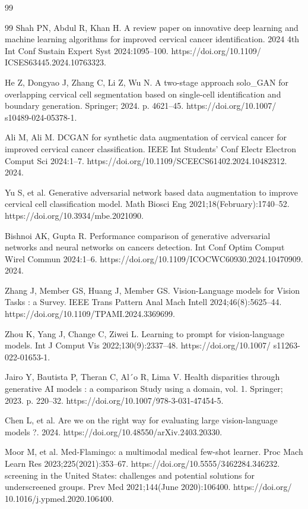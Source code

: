 \documentclass{svjour3}
\begin{document}
\begin{thebibliography}{99}
\begin{thebibliography}{99}
 Shah PN, Abdul R, Khan H. A review paper on innovative deep learning and machine learning algorithms for improved cervical cancer identification. 2024 4th Int Conf Sustain Expert Syst 2024:1095–100. https://doi.org/10.1109/ ICSES63445.2024.10763323.

 He Z, Dongyao J, Zhang C, Li Z, Wu N. A two-stage approach solo_GAN for overlapping cervical cell segmentation based on single-cell identification and boundary generation. Springer; 2024. p. 4621–45. https://doi.org/10.1007/ s10489-024-05378-1.

 Ali M, Ali M. DCGAN for synthetic data augmentation of cervical cancer for improved cervical cancer classification. IEEE Int Students’ Conf Electr Electron Comput Sci 2024:1–7. https://doi.org/10.1109/SCEECS61402.2024.10482312. 2024.

 Yu S, et al. Generative adversarial network based data augmentation to improve cervical cell classification model. Math Biosci Eng 2021;18(February):1740–52. https://doi.org/10.3934/mbe.2021090.

 Bishnoi AK, Gupta R. Performance comparison of generative adversarial networks and neural networks on cancers detection. Int Conf Optim Comput Wirel Commun 2024:1–6. https://doi.org/10.1109/ICOCWC60930.2024.10470909. 2024.

 Zhang J, Member GS, Huang J, Member GS. Vision-Language models for Vision Tasks : a Survey. IEEE Trans Pattern Anal Mach Intell 2024;46(8):5625–44. https://doi.org/10.1109/TPAMI.2024.3369699.

 Zhou K, Yang J, Change C, Ziwei L. Learning to prompt for vision-language models. Int J Comput Vis 2022;130(9):2337–48. https://doi.org/10.1007/ s11263-022-01653-1.

 Jairo Y, Bautista P, Theran C, Al´o R, Lima V. Health disparities through generative AI models : a comparison Study using a domain, vol. 1. Springer; 2023. p. 220–32. https://doi.org/10.1007/978-3-031-47454-5.

 Chen L, et al. Are we on the right way for evaluating large vision-language models ?. 2024. https://doi.org/10.48550/arXiv.2403.20330.

 Moor M, et al. Med-Flamingo: a multimodal medical few-shot learner. Proc Mach Learn Res 2023;225(2021):353–67. https://doi.org/10.5555/3462284.346232. screening in the United States: challenges and potential solutions for underscreened groups. Prev Med 2021;144(June 2020):106400. https://doi.org/ 10.1016/j.ypmed.2020.106400.


\end{thebibliography}
\end{thebibliography}
\end{document}
